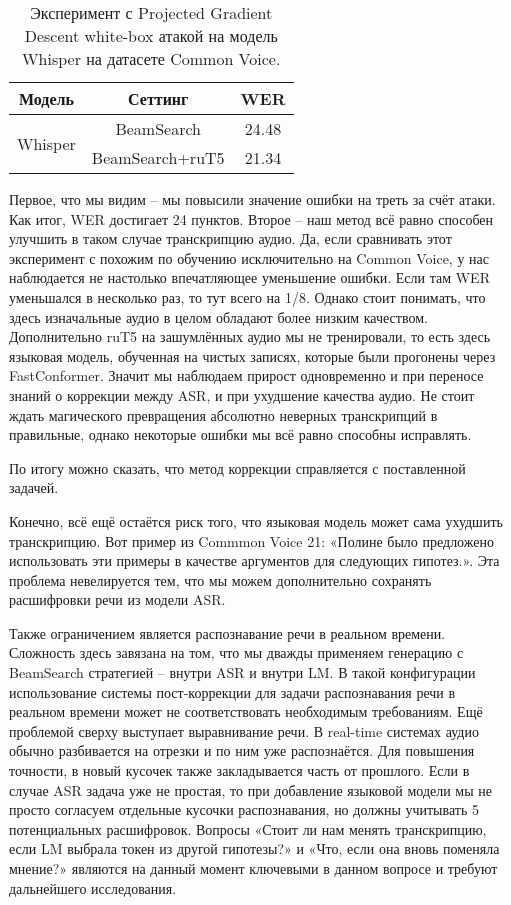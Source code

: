 \begin{table}[]
\centering
\caption{Эксперимент с Projected Gradient Descent white-box атакой на модель Whisper на датасете Common Voice.}
\begin{tabular}{|c|c|c|}
\hline
Модель                         & Сеттинг                              & WER     \\ \hline
\multirow{2}{*}{Whisper}       & BeamSearch                           & 24.48   \\ \cline{2-3} 
                               & BeamSearch+ruT5                      & 21.34   \\ \hline
\end{tabular}
\label{tab:pgd}
\end{table}

Первое, что мы видим -- мы повысили значение ошибки на треть за счёт атаки.
Как итог, WER достигает 24 пунктов.
Второе -- наш метод всё равно способен улучшить в таком случае транскрипцию аудио.
Да, если сравнивать этот эксперимент с похожим по обучению исключительно на Common Voice, у нас наблюдается не настолько впечатляющее уменьшение ошибки.
Если там WER уменьшался в несколько раз, то тут всего на 1/8.
Однако стоит понимать, что здесь изначальные аудио в целом обладают более низким качеством.
Дополнительно ruT5 на зашумлённых аудио мы не тренировали, то есть здесь языковая модель, обученная на чистых записях, которые были прогонены через FastConformer.
Значит мы наблюдаем прирост одновременно и при переносе знаний о коррекции между ASR, и при ухудшение качества аудио.
Не стоит ждать магического превращения абсолютно неверных транскрипций в правильные, однако некоторые ошибки мы всё равно способны исправлять.

По итогу можно сказать, что метод коррекции справляется с поставленной задачей.

Конечно, всё ещё остаётся риск того, что языковая модель может сама ухудшить транскрипцию.
Вот пример из Commmon Voice 21: «Полине было предложено использовать эти примеры в качестве аргументов для следующих гипотез.».
Эта проблема невелируется тем, что мы можем дополнительно сохранять расшифровки речи из модели ASR.

Также ограничением является распознавание речи в реальном времени.
Сложность здесь завязана на том, что мы дважды применяем генерацию с BeamSearch стратегией -- внутри ASR и внутри LM.
В такой конфигурации использование системы пост-коррекции для задачи распознавания речи в реальном времени может не соответствовать необходимым требованиям.
Ещё проблемой сверху выступает выравнивание речи.
В real-time системах аудио обычно разбивается на отрезки и по ним уже распознаётся.
Для повышения точности, в новый кусочек также закладывается часть от прошлого.
Если в случае ASR задача уже не простая, то при добавление языковой модели мы не просто согласуем отдельные кусочки распознавания, но должны учитывать 5 потенциальных расшифровок.
Вопросы «Стоит ли нам менять транскрипцию, если LM выбрала токен из другой гипотезы?» и «Что, если она вновь поменяла мнение?» являются на данный момент ключевыми в данном вопросе и требуют дальнейшего исследования.

